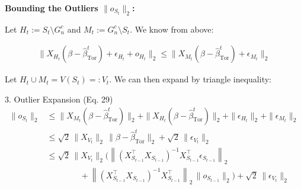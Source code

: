 \begin{frame}[shrink=10]
    \textbf{Bounding the Outliers $\|o_{S_t}\|_2$:}
    
    Let $H_t := S_t \setminus G_n^c$ and $M_t := G_n^c \setminus S_t$. We know from above:
    
    \begin{block}{}
    \vspace{-0.4cm}
    \begin{align*}
        \|X_{H_t} (\beta - \hat{\beta}_{\text{Tor}}^t) + \epsilon_{H_t} + o_{H_t}\|_2
        \leq
        \|X_{M_t} (\beta - \hat{\beta}_{\text{Tor}}^t) + \epsilon_{M_t}\|_2
    \end{align*}
    \end{block}

    Let $H_t \cup M_t = V(S_t) =: V_t$. We can then expand by triangle inequality:
    
    \begin{block}{3. Outlier Expansion (Eq. 29)}
        \vspace{-0.4cm}
        \begin{align*}
        \|o_{S_t}\|_2
        &\leq \|X_{M_t} (\beta - \hat{\beta}_{\text{Tor}}^t)\|_2
        + \|X_{H_t} (\beta - \hat{\beta}_{\text{Tor}}^t)\|_2
        + \|\epsilon_{H_t}\|_2
        + \|\epsilon_{M_t}\|_2 \\[0.2cm]
        &\leq \sqrt{2}\,\|X_{V_t}\|_{2}\,\|\beta - \hat{\beta}_{\text{Tor}}^t\|_2
        + \sqrt{2}\,\|\epsilon_{V_t}\|_2 \\[0.2cm]
        &\leq \sqrt{2}\,\|X_{V_t}\|_{2}
        \Big(
        \left\| (X_{S_{t-1}}^\top X_{S_{t-1}})^{-1} X_{S_{t-1}}^\top \epsilon_{S_{t-1}} \right\|_2 \\
        &\qquad\qquad
        + \left\| (X_{S_{t-1}}^\top X_{S_{t-1}})^{-1} X_{S_{t-1}}^\top \right\|_{2}\,
        \|o_{S_{t-1}}\|_2
        \Big)
        + \sqrt{2}\,\|\epsilon_{V_t}\|_2
        \end{align*}
    \end{block}


\end{frame}
